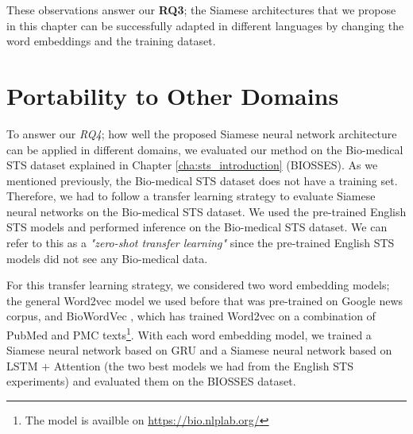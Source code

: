 These observations answer our \textbf{RQ3}; the Siamese architectures that we propose in this chapter can be successfully adapted in different languages by changing the word embeddings and the training dataset.

\section{Portability to Other Domains}
\label{sec:siamese_domains}
To answer our \textit{RQ4}; how well the proposed Siamese neural network architecture can be applied in different domains, we evaluated our method on the Bio-medical STS dataset explained in Chapter \ref{cha:sts_introduction} (BIOSSES). As we mentioned previously, the Bio-medical STS dataset does not have a training set. Therefore, we had to follow a transfer learning strategy to evaluate Siamese neural networks on the Bio-medical STS dataset. We used the pre-trained English STS models and performed inference on the Bio-medical STS dataset. We can refer to this as a \textit{"zero-shot transfer learning"} since the pre-trained English STS models did not see any Bio-medical data.

For this transfer learning strategy, we considered two word embedding models; the general Word2vec model we used before \textcite{DBLP:journals/corr/abs-1301-3781} that was pre-trained on Google news corpus, and BioWordVec \textcite{Zhang2019}, which has trained Word2vec on a combination of PubMed and PMC texts\footnote{The model is availble on \url{https://bio.nlplab.org/}}. With each word embedding model, we trained a Siamese neural network based on GRU and a Siamese neural network based on LSTM + Attention (the two best models we had from the English STS experiments) and evaluated them on the BIOSSES dataset.


